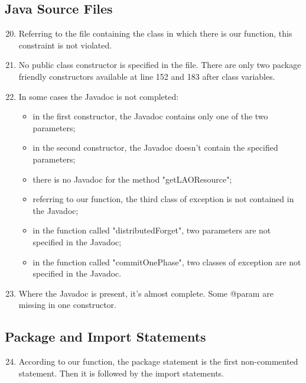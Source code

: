 \subsection{Java Source Files}
\begin{enumerate}
	\setcounter{enumi}{19}
	\item Referring to the file containing the class in which there is our function, this constraint is not violated.
	\item No public class constructor is specified in the file. There are only two package friendly constructors available at line 152 and 183 after class variables.
	\item In some cases the Javadoc is not completed:
	    \begin{itemize}
	        \item in the first constructor, the Javadoc contains only one of the two parameters;
	        \item in the second constructor, the Javadoc doesn't contain the specified parameters;
	        \item there is no Javadoc for the method "getLAOResource";
	        \item referring to our function, the third class of exception is not contained in the Javadoc;
	        \item in the function called "distributedForget", two parameters are not specified in the Javadoc;
	        \item in the function called "commitOnePhase", two classes of exception are not specified in the Javadoc.
	    \end{itemize}
	\item Where the Javadoc is present, it's almost complete. Some @param are missing in one constructor.
\end{enumerate}
\subsection{Package and Import Statements}
\begin{enumerate}
	\setcounter{enumi}{23}
	\item According to our function, the package statement is the first non-commented statement. Then it is followed by the import statements.
\end{enumerate}
